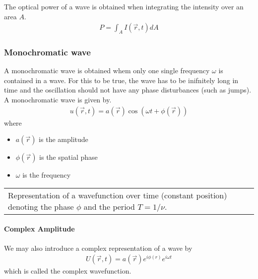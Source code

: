 \documentclass[letterpaper,10pt,english]{sphinxmanual}
\begin{document}
The optical power of a wave is obtained when integrating the intensity over an area \(A\).
\begin{equation*}
\begin{split}P=\int_A I(\vec{r},t) dA\end{split}
\end{equation*}

\subsubsection{Monochromatic wave}
\label{\detokenize{notebooks/L8/Wave Optics:Monochromatic-wave}}
A monochromatic wave is obtained whem only one single frequency \(\omega\) is contained in a wave. For this to be true, the wave has to be inifnitely long in time and the oscillation should not have any phase disturbances (such as jumps). A monochromatic wave is given by.
\begin{equation*}
\begin{split}u(\vec{r},t)=a(\vec{r})\cos(\omega t + \phi(\vec{r}))\end{split}
\end{equation*}
where
\begin{itemize}
\item {} 
\(a(\vec{r})\) is the amplitude

\item {} 
\(\phi(\vec{r})\) is the spatial phase

\item {} 
\(\omega\) is the frequency

\end{itemize}


\begin{savenotes}\sphinxattablestart
\centering
\begin{tabulary}{\linewidth}[t]{|T|}
\hline
\sphinxstyletheadfamily 
{}
\\
\hline
{} Representation of a wavefunction over time (constant position) denoting the phase \(\phi\) and the period \(T=1/\nu\).
\\
\hline
\end{tabulary}
\par
\sphinxattableend\end{savenotes}


\paragraph{Complex Amplitude}
\label{\detokenize{notebooks/L8/Wave Optics:Complex-Amplitude}}
We may also introduce a complex representation of a wave by
\begin{equation*}
\begin{split}U(\vec{r},t)=a(\vec{r})e^{i\phi(r)}e^{i\omega t}\end{split}
\end{equation*}
which is called the complex wavefunction.
\end{document}
